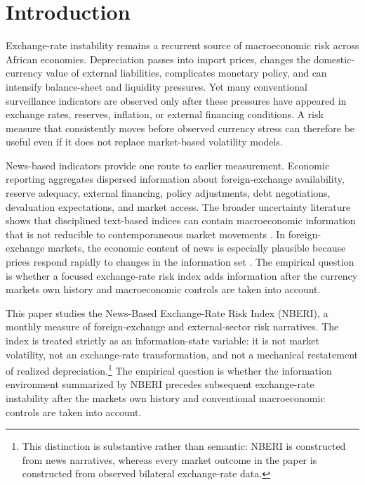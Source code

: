 \documentclass[11pt]{article}
\begin{document}
\section{Introduction}\label{introduction}

Exchange-rate instability remains a recurrent source of macroeconomic
risk across African economies. Depreciation passes into import prices,
changes the domestic-currency value of external liabilities, complicates
monetary policy, and can intensify balance-sheet and liquidity
pressures. Yet many conventional surveillance indicators are observed
only after these pressures have appeared in exchange rates, reserves,
inflation, or external financing conditions. A risk measure that
consistently moves before observed currency stress can therefore be
useful even if it does not replace market-based volatility models.

News-based indicators provide one route to earlier measurement. Economic
reporting aggregates dispersed information about foreign-exchange
availability, reserve adequacy, external financing, policy adjustments,
debt negotiations, devaluation expectations, and market access. The
broader uncertainty literature shows that disciplined text-based indices
can contain macroeconomic information that is not reducible to
contemporaneous market movements \citep{baker2016,caldara2022}. In foreign-exchange markets, the economic content
of news is especially plausible because prices respond rapidly to
changes in the information set \citep{andersen2003}. The empirical
question is whether a focused exchange-rate risk index adds information
after the currency market\textquotesingle s own history and
macroeconomic controls are taken into account.

This paper studies the News-Based Exchange-Rate Risk Index (NBERI), a
monthly measure of foreign-exchange and external-sector risk narratives.
The index is treated strictly as an information-state variable: it is
not market volatility, not an exchange-rate transformation, and not a
mechanical restatement of realized depreciation.\footnote{This distinction is substantive rather than semantic: NBERI is constructed from news narratives, whereas every market outcome in the paper is constructed from observed bilateral exchange-rate data.} The empirical question
is whether the information environment summarized by NBERI precedes
subsequent exchange-rate instability after the market\textquotesingle s
own history and conventional macroeconomic controls are taken into
account.
\end{document}

